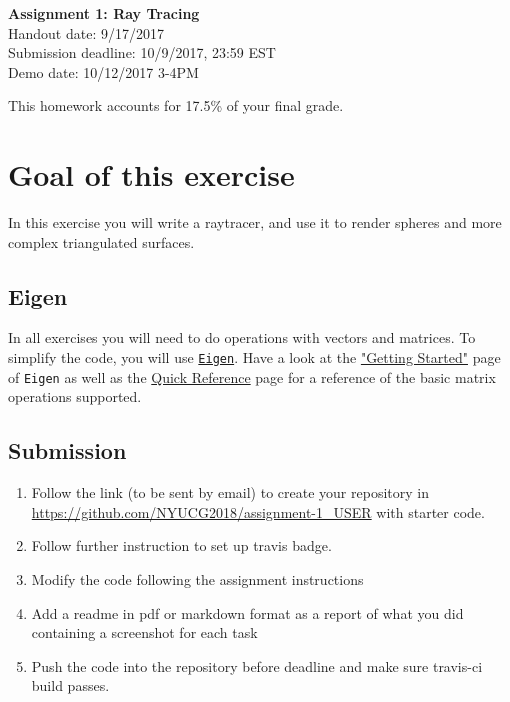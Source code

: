 \documentclass[11pt]{article}
\begin{document}
\hspace{50pt}

\begin{center}

{\Huge \textbf{Assignment 1: Ray Tracing}}\\
\vspace{10pt}
Handout date: 9/17/2017\\
Submission deadline: 10/9/2017,  23:59 EST\\
Demo date: 10/12/2017 3-4PM 
\end{center}

\noindent This homework accounts for 17.5\% of your final grade. 

\section*{Goal of this exercise}
In this exercise you will write a raytracer, and use it to render spheres and more complex triangulated surfaces.

\subsection*{Eigen}
In all exercises you will need to do operations with vectors and matrices. To simplify the code, you will use \href{http://eigen.tuxfamily.org/}{\texttt{Eigen}}. 
Have a look at the \href{http://eigen.tuxfamily.org/dox/GettingStarted.html}{"Getting Started"} page of \texttt{Eigen} as well as the \href{http://eigen.tuxfamily.org/dox/group__QuickRefPage.html}{Quick Reference} page for a reference of the basic matrix operations supported. 

\subsection*{Submission}

\begin{enumerate}
\item Follow the link (to be sent by email) to create your repository in \url{https://github.com/NYUCG2018/assignment-1_USER} with starter code.
\item Follow further instruction to set up travis badge.
\item Modify the code following the assignment instructions
\item Add a readme in pdf or markdown format as a report of what you did containing a screenshot for each task
\item Push the code into the repository before deadline and make sure travis-ci build passes.
\end{enumerate}
\end{document}
